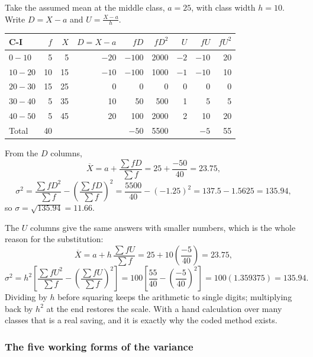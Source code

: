 \documentclass[11pt,a4paper]{article}
\theoremstyle{definition}
\begin{document}
Take the assumed mean at the middle class, $a=25$, with class width $h=10$. Write
$D=X-a$ and $U=\frac{X-a}{h}$.
\begin{table}[H]
\centering
\begin{tabular}{lrrrrrrrr}
C-I & $f$ & $X$ & $D=X-a$ & $fD$ & $fD^2$ & $U$ & $fU$ & $fU^2$\\
\hline
$0-10$  & 5  & 5  & $-20$ & $-100$ & 2000 & $-2$ & $-10$ & 20\\
$10-20$ & 10 & 15 & $-10$ & $-100$ & 1000 & $-1$ & $-10$ & 10\\
$20-30$ & 15 & 25 & 0     & 0      & 0    & 0    & 0     & 0\\
$30-40$ & 5  & 35 & 10    & 50     & 500  & 1    & 5     & 5\\
$40-50$ & 5  & 45 & 20    & 100    & 2000 & 2    & 10    & 20\\
\hline
Total   & 40 &    &       & $-50$  & 5500 &      & $-5$  & 55\\
\end{tabular}
\end{table}

From the $D$ columns,
\[\overline{X}=a+\frac{\sum fD}{\sum f}=25+\frac{-50}{40}=23.75,\]
\[\sigma^2=\frac{\sum fD^2}{\sum f}-\left(\frac{\sum fD}{\sum f}\right)^{2}
=\frac{5500}{40}-(-1.25)^2=137.5-1.5625=135.94,\]
so $\sigma=\sqrt{135.94}=11.66$.

The $U$ columns give the same answers with smaller numbers, which is the whole reason for
the substitution:
\[\overline{X}=a+h\,\frac{\sum fU}{\sum f}=25+10\left(\frac{-5}{40}\right)=23.75,\]
\[\sigma^2=h^2\left[\frac{\sum fU^2}{\sum f}-\left(\frac{\sum fU}{\sum f}\right)^{2}\right]
=100\left[\frac{55}{40}-\left(\frac{-5}{40}\right)^{2}\right]=100(1.359375)=135.94.\]
Dividing by $h$ before squaring keeps the arithmetic to single digits; multiplying back by
$h^2$ at the end restores the scale. With a hand calculation over many classes that is a
real saving, and it is exactly why the coded method exists.




\subsubsection{The five working forms of the variance}
\end{document}
